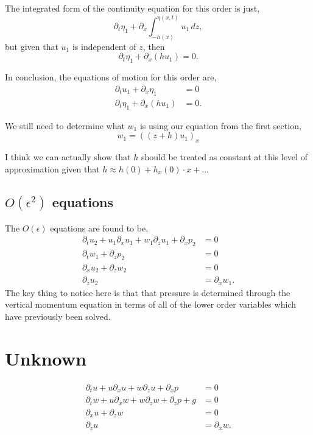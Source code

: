 \documentclass[11pt]{article}
\begin{document}
The integrated form of the continuity equation for this order is just,
\begin{equation}
\partial_t \eta_1 + \partial_x \int_{-h(x)}^{\eta(x,t)} u_1 \, dz,
\end{equation}
but given that $u_1$ is independent of $z$, then
\begin{equation}
\partial_t \eta_1 + \partial_x \left( h u_1 \right) = 0.
\end{equation}

In conclusion, the equations of motion for this order are,
\begin{align}
\partial_t u_1 + \partial_x \eta_1 &=0 \\
\partial_t \eta_1 + \partial_x \left( h u_1 \right)  &= 0 .
\end{align}

We still need to determine what $w_1$ is using our equation from the first section,
\begin{equation}
w_1 = \left( (z+h) u_1 \right)_x
\end{equation}

I think we can actually show that $h$ should be treated as constant at this level of approximation given that $h \approx h(0) + h_x(0)\cdot x + ...$

\subsection{$O(\epsilon^2)$ equations}
The $O(\epsilon)$ equations are found to be,
\begin{align}
\partial_t u_2 + u_1 \partial_x u_1 + w_1 \partial_z u_1 + \partial_x p_2 &=0 \\
\partial_t w_1  + \partial_z p_2  &=0 \\
\partial_x u_2 + \partial_z w_2 &= 0 \\
\partial_z u_2 &= \partial_x w_1.
\end{align}
The key thing to notice here is that that pressure is determined through the vertical momentum equation in terms of all of the lower order variables which have previously been solved.

\section{Unknown}
\begin{align}
\partial_t u + u \partial_x u + w \partial_z u + \partial_x p &=0 \\
\partial_t w + u \partial_x w + w \partial_z w + \partial_z p + g &=0 \\
\partial_x u + \partial_z w &= 0 \\
\partial_z u &= \partial_x w.
\end{align}
\end{document}
